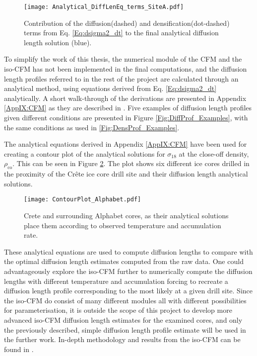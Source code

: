 \documentclass[../../CompleteThesis2/Complete_2ndDraft]{subfiles}
\begin{document}
\begin{figure}
	\centering
	\texttt{[image: Analytical\_DiffLenEq\_terms\_SiteA.pdf]}
	\caption[Rate terms in the diffusion equation.]{\small Contribution of the diffusion(dashed) and densification(dot-dashed) terms from Eq. \ref{Eq:dsigma2_dt} to the final analytical diffusion length solution (blue).}
	\label{Fig:ICE_DiffDensTerms}
\end{figure}

To simplify the work of this thesis, the numerical module of the CFM and the iso-CFM has not been implemented in the final computations, and the diffusion length profiles referred to in the rest of the project are calculated through an analytical method, using equations derived from Eq. \ref{Eq:dsigma2_dt} analytically. A short walk-through of the derivations are presented in Appendix \ref{AppIX:CFM} as they are described in \cite[Gkinis et al., 2021]{Gkinis2021}. Five examples of diffusion length profiles given different conditions are presented in Figure \ref{Fig:DiffProf_Examples}, with the same conditions as used in \ref{Fig:DensProf_Examples}.

The analytical equations derived in Appendix \ref{AppIX:CFM} have been used for creating a contour plot of the analytical solutions for $\sigma_{18}$ at the close-off density, $\rho_{\text{co}}$. This can be seen in Figure \ref{Fig:ICE_ContourPlot}. The plot shows six different ice cores drilled in the proximity of the Crête ice core drill site and their diffusion length analytical solutions.

\begin{figure}
	\centering
	\texttt{[image: ContourPlot\_Alphabet.pdf]}
	\caption[Analytical solutions of diffusion length, Alphabet cores.]{\small Crete and surrounding Alphabet cores, as their analytical solutions place them according to observed temperature and accumulation rate.}
	\label{Fig:ICE_ContourPlot}
\end{figure}


These analytical equations are used to compute diffusion lengths to compare with the optimal diffusion length estimates computed from the raw data. One could advantageously explore the iso-CFM further to numerically compute the diffusion lengths with different temperature and accumulation forcing to recreate a diffusion length profile corresponding to the most likely at a given drill site. Since the iso-CFM do consist of many different modules all with different possibilities for parameterisation, it is outside the scope of this project to develop more advanced iso-CFM diffusion length estimates for the examined cores, and only the previously described, simple diffusion length profile estimate will be used in the further work. In-depth methodology and results from the iso-CFM can be found in \cite[Gkinis et al., 2021]{Gkinis2021}.
\end{document}
